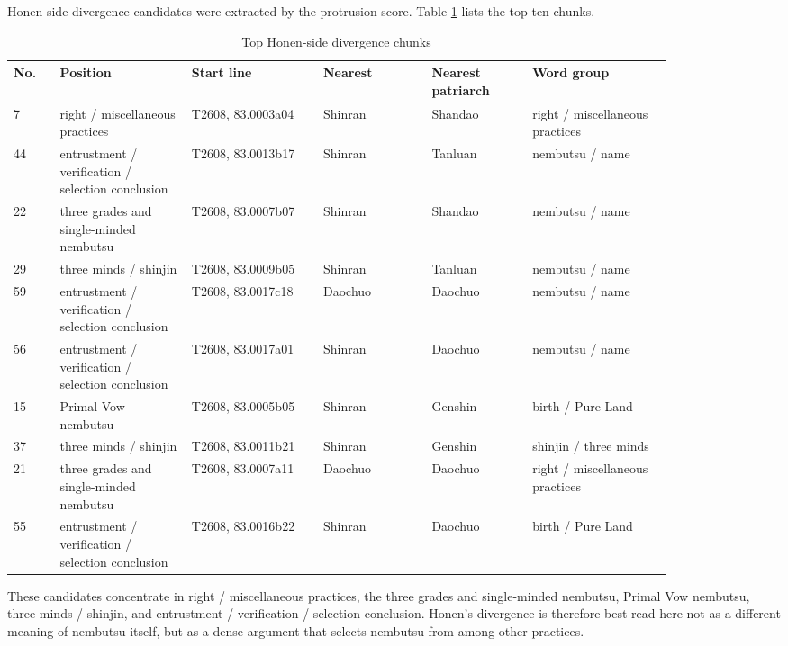 \documentclass[uplatex,dvipdfmx,11pt,a4paper]{jsarticle}
\begin{document}
Honen-side divergence candidates were extracted by the protrusion score. Table \ref{tab:honen-protrusion} lists the top ten chunks.

\begin{table}[H]
\centering
\footnotesize
\setlength{\tabcolsep}{2pt}
\caption{Top Honen-side divergence chunks}
\label{tab:honen-protrusion}
\begin{tabular}{@{}p{0.06\linewidth}p{0.17\linewidth}p{0.17\linewidth}p{0.14\linewidth}p{0.13\linewidth}p{0.18\linewidth}@{}}
\toprule
No. & Position & Start line & Nearest & Nearest patriarch & Word group \\
\midrule
7 & right / miscellaneous practices & T2608, 83.0003a04 & Shinran & Shandao & right / miscellaneous practices \\
44 & entrustment / verification / selection conclusion & T2608, 83.0013b17 & Shinran & Tanluan & nembutsu / name \\
22 & three grades and single-minded nembutsu & T2608, 83.0007b07 & Shinran & Shandao & nembutsu / name \\
29 & three minds / shinjin & T2608, 83.0009b05 & Shinran & Tanluan & nembutsu / name \\
59 & entrustment / verification / selection conclusion & T2608, 83.0017c18 & Daochuo & Daochuo & nembutsu / name \\
56 & entrustment / verification / selection conclusion & T2608, 83.0017a01 & Shinran & Daochuo & nembutsu / name \\
15 & Primal Vow nembutsu & T2608, 83.0005b05 & Shinran & Genshin & birth / Pure Land \\
37 & three minds / shinjin & T2608, 83.0011b21 & Shinran & Genshin & shinjin / three minds \\
21 & three grades and single-minded nembutsu & T2608, 83.0007a11 & Daochuo & Daochuo & right / miscellaneous practices \\
55 & entrustment / verification / selection conclusion & T2608, 83.0016b22 & Shinran & Daochuo & birth / Pure Land \\
\bottomrule
\end{tabular}
\end{table}

These candidates concentrate in right / miscellaneous practices, the three grades and single-minded nembutsu, Primal Vow nembutsu, three minds / shinjin, and entrustment / verification / selection conclusion. Honen's divergence is therefore best read here not as a different meaning of nembutsu itself, but as a dense argument that selects nembutsu from among other practices.
\end{document}
